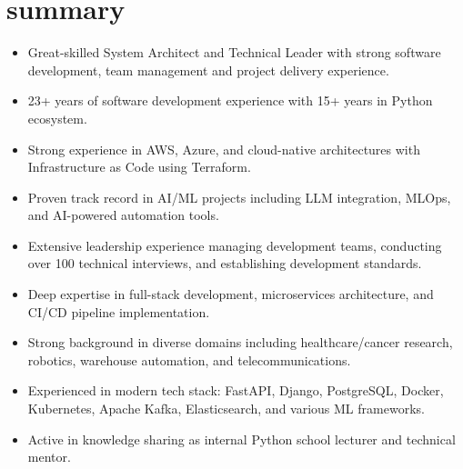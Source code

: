 \section{summary}

\begin{itemize}[noitemsep]
	\item Great-skilled System Architect and Technical Leader with strong software development, team management and project delivery experience.
	\item 23+ years of software development experience with 15+ years in Python ecosystem.
	\item Strong experience in AWS, Azure, and cloud-native architectures with Infrastructure as Code using Terraform.
	\item Proven track record in AI/ML projects including LLM integration, MLOps, and AI-powered automation tools.
	\item Extensive leadership experience managing development teams, conducting over 100 technical interviews, and establishing development standards.
	\item Deep expertise in full-stack development, microservices architecture, and CI/CD pipeline implementation.
	\item Strong background in diverse domains including healthcare/cancer research, robotics, warehouse automation, and telecommunications.
	\item Experienced in modern tech stack: FastAPI, Django, PostgreSQL, Docker, Kubernetes, Apache Kafka, Elasticsearch, and various ML frameworks.
	\item Active in knowledge sharing as internal Python school lecturer and technical mentor.
\end{itemize}

